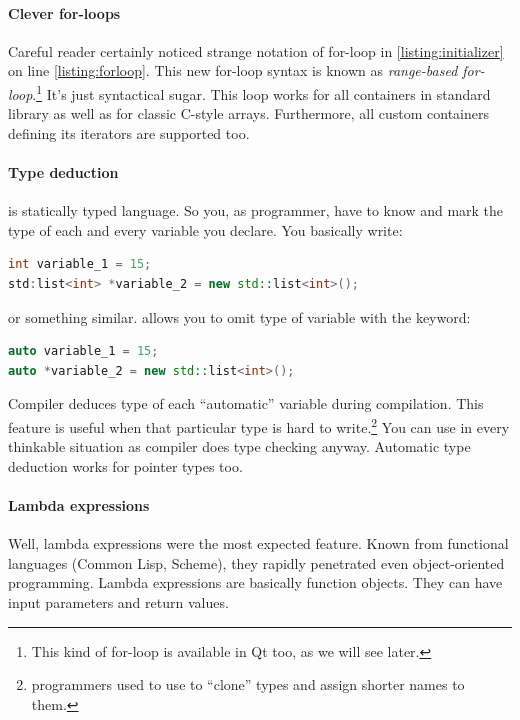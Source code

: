 \paragraph*{Clever for-loops}
Careful reader certainly noticed strange notation of for-loop in \autoref{listing:initializer} on line \ref{listing:forloop}. This new for-loop syntax is known as \textit{range-based for-loop}.\footnote{This kind of for-loop is available in Qt too, as we will see later.} It's just syntactical sugar. This loop works for all containers in standard library as well as for classic C-style arrays. Furthermore, all custom containers defining its iterators are supported too.

\paragraph*{Type deduction}
\cpp is statically typed language. So you, as programmer, have to know and mark the type of each and every variable you declare. You basically write:
\begin{lstlisting}[firstnumber=1,language=cpp]
int variable_1 = 15;
std:list<int> *variable_2 = new std::list<int>();
\end{lstlisting}
or something similar.  allows you to omit type of variable with the keyword:
\begin{lstlisting}[firstnumber=1,language=cpp]
auto variable_1 = 15;
auto *variable_2 = new std::list<int>();
\end{lstlisting}
Compiler deduces type of each \enquote{automatic} variable during compilation. This feature is useful when that particular type is hard to write.\footnote{\cpp programmers used to use to \enquote{clone} types and assign shorter names to them.} You can use in every thinkable situation as compiler does type checking anyway. Automatic type deduction works for pointer types too.

\paragraph*{Lambda expressions}
Well, lambda expressions were the most expected feature. Known from functional languages (\eg Common Lisp, Scheme), they rapidly penetrated even object-oriented programming. Lambda expressions are basically function objects. They can have input parameters and return values.

